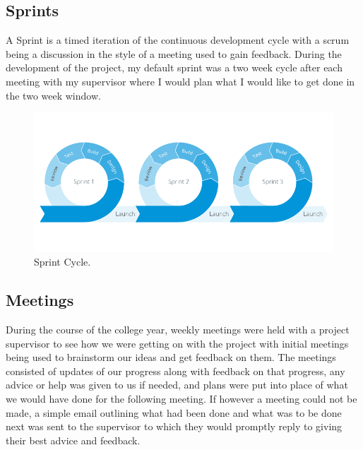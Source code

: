 \newpage

\subsection{Sprints}

A Sprint is a timed iteration of the continuous development cycle with a scrum being a discussion in the style of a meeting used to gain feedback. During the development of the project, my default sprint was a two week cycle after each meeting with my supervisor where I would plan what I would like to get done in the two week window. \cite{Sprints}

\begin{figure}[h]
  \includegraphics[width=\linewidth]{Images/AgileSprint.png}
  \caption{Sprint Cycle.}
  \label{fig:Sprint Cycle}
\end{figure}


\subsection{Meetings}

During the course of the college year, weekly meetings were held with a project supervisor to see how we were getting on with the project with initial meetings being used to brainstorm our ideas and get feedback on them. The meetings consisted of updates of our progress along with feedback on that progress, any advice or help was given to us if needed, and plans were put into place of what we would have done for the following meeting. If however a meeting could not be made, a simple email outlining what had been done and what was to be done next was sent to the supervisor to which they would promptly reply to giving their best advice and feedback.
\newpage


